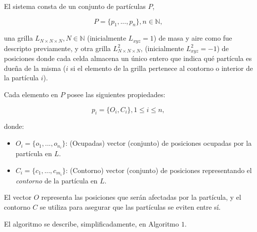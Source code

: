 El sistema consta de un conjunto de part\'iculas $P$,

\begin{equation}
  P = \{p_{1}, ... , p_{n}\}, n  \in \mathbb{N},
\end{equation}

\noindent una grilla $L_{N\times N \times N}, N \in \mathbb{N} $ (inicialmente $L_{xyz}=1$) de masa y aire como fue descripto previamente, y otra grilla $L^{2}_{N\times N \times N}$, (inicialmente $L^{2}_{xyz}=-1$) de posiciones donde cada celda almacena un único entero que indica qu\'e part\'icula es due\~na de la misma ($i$ si el elemento de la grilla pertenece al contorno o interior de la part\'icula $i$).

Cada elemento en $P$ posee las siguientes propiedades:

\begin{equation}
  p_{i} = \{O_{i}, C_{i}\}, 1 \le i \le n,
\end{equation}

\noindent donde:

\begin{itemize}
\item $O_{i} = \{o_{1}, ... , o_{n_{i}}\}$: (Ocupadas) vector (conjunto) de posiciones ocupadas por la part\'icula en $L$.

\item $C_{i} = \{c_{1}, ... , c_{m_{i}}\}$: (Contorno) vector (conjunto) de posiciones representando el {\em contorno} de la part\'icula en $L$.
\end{itemize}

El vector $O$ representa las posiciones que ser\'an afectadas por la part\'icula, y el contorno $C$ se utiliza para asegurar que las part\'iculas se eviten entre s\'i.

El algoritmo se describe, simplificadamente, en Algoritmo $1$. 

